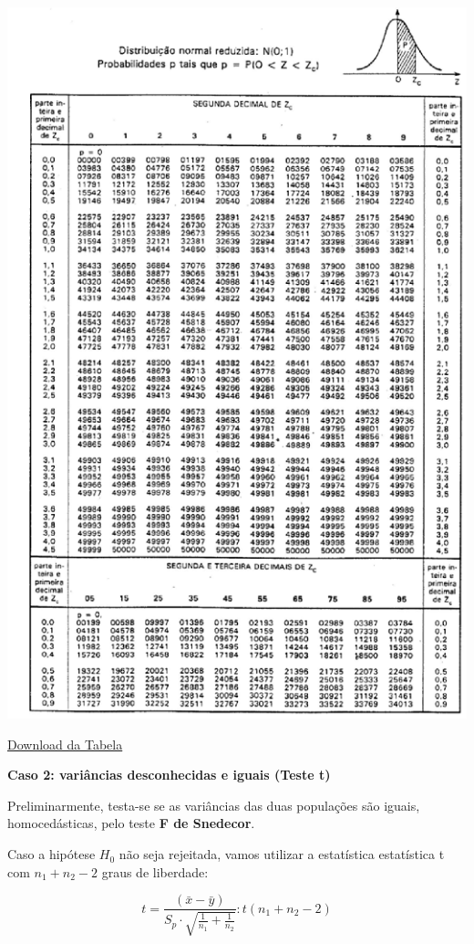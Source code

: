 \documentclass[
]{book}
\begin{document}
\includegraphics{tabnPad.png}

\href{https://github.com/arpanosso/ExpAgr_2020/raw/master/TabelaNormal.pdf}{Download da Tabela}

\textbf{Caso 2: variâncias desconhecidas e iguais (Teste t)}

Preliminarmente, testa-se se as variâncias das duas populações são iguais, homocedásticas, pelo teste \textbf{F de Snedecor}.

Caso a hipótese \(H_0\) não seja rejeitada, vamos utilizar a estatística estatística t com \(n_1+n_2 - 2\) graus de liberdade:

\[
t = \frac{(\bar{x} - \bar{y})}{S_p \cdot \sqrt{\frac{1}{n_1} +\frac{1}{n_2}} }: t(n_1+n_2 - 2)
\]
\end{document}
